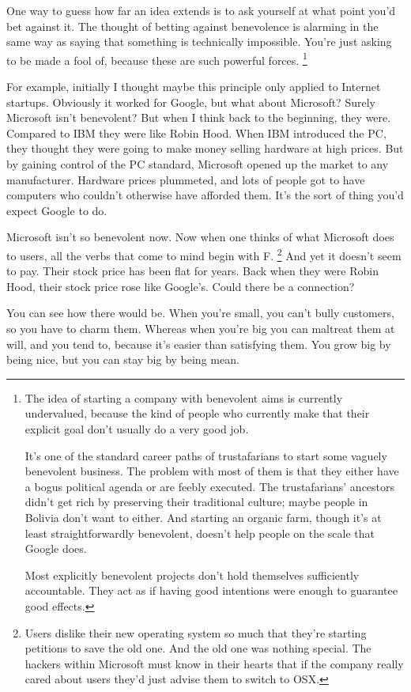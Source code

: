 \documentclass[12pt]{book}
\begin{document}
One way to guess how far an idea extends is to ask yourself at what
point you'd bet against it. The thought of betting against benevolence
is alarming in the same way as saying that something is technically
impossible. You're just asking to be made a fool of, because these are
such powerful forces. \footnote{The idea of starting a company with benevolent aims is currently
undervalued, because the kind of people who currently make that their
explicit goal don't usually do a very good job.

It's one of the standard career paths of trustafarians to start some
vaguely benevolent business. The problem with most of them is that they
either have a bogus political agenda or are feebly executed. The
trustafarians' ancestors didn't get rich by preserving their traditional
culture; maybe people in Bolivia don't want to either. And starting an
organic farm, though it's at least straightforwardly benevolent, doesn't
help people on the scale that Google does.

Most explicitly benevolent projects don't hold themselves sufficiently
accountable. They act as if having good intentions were enough to
guarantee good effects.}

For example, initially I thought maybe this principle only applied to
Internet startups. Obviously it worked for Google, but what about
Microsoft? Surely Microsoft isn't benevolent? But when I think back to
the beginning, they were. Compared to IBM they were like Robin Hood.
When IBM introduced the PC, they thought they were going to make money
selling hardware at high prices. But by gaining control of the PC
standard, Microsoft opened up the market to any manufacturer. Hardware
prices plummeted, and lots of people got to have computers who couldn't
otherwise have afforded them. It's the sort of thing you'd expect Google
to do.

Microsoft isn't so benevolent now. Now when one thinks of what Microsoft
does to users, all the verbs that come to mind begin with F.
\footnote{Users dislike their new operating system so much that they're
starting petitions to save the old one. And the old one was nothing
special. The hackers within Microsoft must know in their hearts that if
the company really cared about users they'd just advise them to switch
to OSX.} And yet it doesn't seem to pay. Their stock
price has been flat for years. Back when they were Robin Hood, their
stock price rose like Google's. Could there be a connection?

You can see how there would be. When you're small, you can't bully
customers, so you have to charm them. Whereas when you're big you can
maltreat them at will, and you tend to, because it's easier than
satisfying them. You grow big by being nice, but you can stay big by
being mean.
\end{document}
